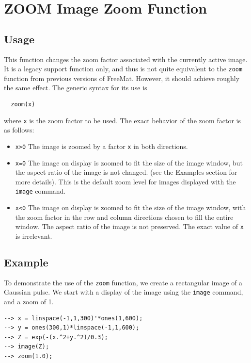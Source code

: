 \section{ZOOM Image Zoom Function}

\subsection{Usage}

This function changes the zoom factor associated with the currently active
image.  It is a legacy support function only, and thus is not quite equivalent
to the \verb|zoom| function from previous versions of FreeMat.  However, it should
achieve roughly the same effect. The generic syntax for its use is
\begin{verbatim}
  zoom(x)
\end{verbatim}
where \verb|x| is the zoom factor to be used.  The exact behavior of the zoom
factor is as follows:
\begin{itemize}
\item  \verb|x>0| The image is zoomed by a factor \verb|x| in both directions.

\item  \verb|x=0| The image on display is zoomed to fit the size of the image window, but
  the aspect ratio of the image is not changed.  (see the Examples section for
more details).  This is the default zoom level for images displayed with the
\verb|image| command.

\item  \verb|x<0| The image on display is zoomed to fit the size of the image window, with
  the zoom factor in the row and column directions chosen to fill the entire window.
  The aspect ratio of the image is not preserved.  The exact value of \verb|x| is
  irrelevant.

\end{itemize}
\subsection{Example}

To demonstrate the use of the \verb|zoom| function, we create a rectangular image 
of a Gaussian pulse.  We start with a display of the image using the \verb|image|
command, and a zoom of 1.
\begin{verbatim}
--> x = linspace(-1,1,300)'*ones(1,600);
--> y = ones(300,1)*linspace(-1,1,600);
--> Z = exp(-(x.^2+y.^2)/0.3);
--> image(Z);
--> zoom(1.0);
\end{verbatim}


